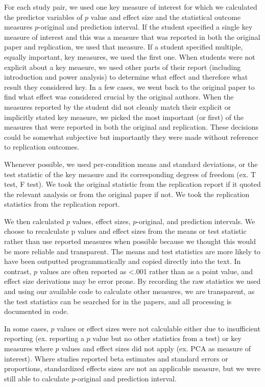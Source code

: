 \documentclass[
  english,
  a4paper,
]{article}
\begin{document}
For each study pair, we used one key measure of interest for which we calculated the predictor variables of \(p\) value and effect size and the statistical outcome measures \(p\)-original and prediction interval. If the student specified a single key measure of interest and this was a measure that was reported in both the original paper and replication, we used that measure. If a student specified multiple, equally important, key measures, we used the first one. When students were not explicit about a key measure, we used other parts of their report (including introduction and power analysis) to determine what effect and therefore what result they considered key. In a few cases, we went back to the original paper to find what effect was considered crucial by the original authors. When the measures reported by the student did not cleanly match their explicit or implicitly stated key measure, we picked the most important (or first) of the measures that were reported in both the original and replication. These decisions could be somewhat subjective but importantly they were made without reference to replication outcomes.

Whenever possible, we used per-condition means and standard deviations, or the test statistic of the key measure and its corresponding degrees of freedom (ex. T test, F test). We took the original statistic from the replication report if it quoted the relevant analysis or from the original paper if not. We took the replication statistics from the replication report.

We then calculated \(p\) values, effect sizes, \(p\)-original, and prediction intervals. We choose to recalculate p values and effect sizes from the means or test statistic rather than use reported measures when possible because we thought this would be more reliable and transparent. The means and test statistics are more likely to have been outputted programmatically and copied directly into the text. In contrast, \(p\) values are often reported as \textless.001 rather than as a point value, and effect size derivations may be error prone. By recording the raw statistics we used and using our available code to calculate other measures, we are transparent, as the test statistics can be searched for in the papers, and all processing is documented in code.

In some cases, \(p\) values or effect sizes were not calculable either due to insufficient reporting (ex. reporting a \(p\) value but no other statistics from a test) or key measures where \(p\) values and effect sizes did not apply (ex. PCA as measure of interest). Where studies reported beta estimates and standard errors or proportions, standardized effects sizes are not an applicable measure, but we were still able to calculate \(p\)-original and prediction interval.
\end{document}
